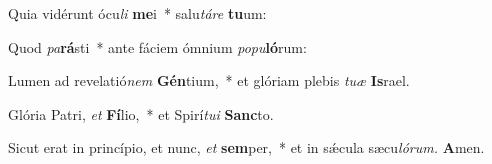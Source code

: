 \item Quia vidérunt ócu\textit{li} \textbf{me}i~* salu\tinyhspace\textit{táre} \textbf{tu}um:
\item Quod \textit{pa}\textbf{rá}sti~* ante fáciem ómnium \textit{popu}\textbf{ló}rum:
\item Lumen ad revelatió\textit{nem} \textbf{Gén}tium,~* et glóriam plebis \textit{tuæ} \textbf{Is}rael.
\item Glória Patri, \textit{et} \textbf{Fí}lio,~* et Spirí\textit{tui} \textbf{Sanc}to.
\item Sicut erat in princípio, et nunc, \textit{et} \textbf{sem}per,~* et in sǽcula sæcu\tinyhspace\textit{lórum.} \textbf{A}men.
